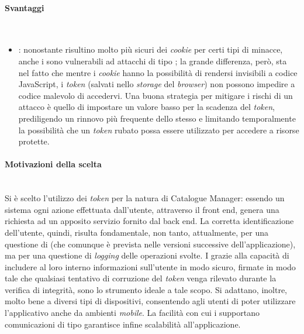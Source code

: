 \paragraph{Svantaggi} \mbox{} \\
\begin{itemize}
\item \textbf{}: nonostante risultino molto più sicuri dei \textit{cookie} per certi tipi di minacce, anche i  sono vulnerabili ad attacchi di tipo ; la
grande differenza, però, sta nel fatto che mentre i \textit{cookie} hanno la possibilità di rendersi invisibili a codice JavaScript, i \textit{token} (salvati nello \textit{storage} del \textit{browser}) non possono impedire a codice malevolo di accedervi. Una buona strategia per mitigare i rischi di un attacco  è quello di impostare un valore basso per la scadenza del \textit{token}, prediligendo un rinnovo più frequente dello stesso e limitando
temporalmente la possibilità che un \textit{token} rubato possa essere utilizzato per accedere a risorse protette.
\end{itemize}

\paragraph{Motivazioni della scelta} \mbox{} \\
Si è scelto l'utilizzo dei \textit{token}  per la natura di Catalogue Manager: essendo un sistema  ogni azione effettuata dall'utente, attraverso il front end, genera una richiesta ad un apposito servizio fornito dal back end. La corretta identificazione dell'utente, quindi, risulta fondamentale, non tanto, attualmente, per una questione di  (che comunque è prevista nelle versioni successive dell'applicazione), ma per una questione di \textit{logging} delle operazioni svolte. I  grazie alla capacità di includere al loro interno informazioni sull'utente in modo sicuro, firmate in modo tale che qualsiasi tentativo di corruzione del \textit{token} venga rilevato durante la verifica di integrità, sono lo strumento ideale a tale scopo. Si adattano, inoltre, molto bene a diversi tipi di dispositivi, consentendo agli utenti di poter utilizzare l'applicativo anche da ambienti \textit{mobile}. La facilità con cui i  supportano comunicazioni di tipo  garantisce infine scalabilità all'applicazione.